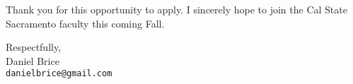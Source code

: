 \documentclass[11pt]{article}
\begin{document}
Thank you for this opportunity to apply. I sincerely hope to join the Cal State Sacramento faculty this coming Fall.

\vfill

Respectfully,\\
Daniel Brice\\
\texttt{danielbrice@gmail.com}

\label{page:last}
\end{document}
